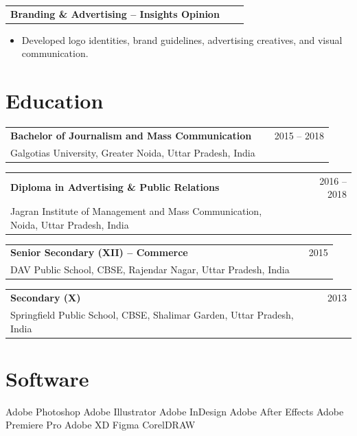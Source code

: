 \documentclass[a4paper,9pt]{article}
\makeatletter
\newenvironment{jobproject}[2]
    {
    \begin{tabularx}{\linewidth}{@{}l X r@{}}
    \textbf{#1} & \hfill & {\color{textgray} #2} \\[3.75pt]
    \end{tabularx}
    \begin{minipage}[t]{\linewidth}
    \begin{itemize}[nosep,after=\strut, leftmargin=1em, itemsep=3pt]
    }
    {
    \end{itemize}
    \end{minipage}
    }
\newenvironment{education}[3]
{
\begin{tabularx}{\linewidth}{@{}l X r@{}}
\textbf{#1} & \hfill & {\color{textgray} #3} \\
{\small\color{textgray} #2} & & \\[6pt]
\end{tabularx}
}
{}
\makeatother
\begin{document}
\begin{jobproject}{Branding \& Advertising – Insights Opinion}{}
\item  Developed logo identities, brand guidelines, advertising creatives, and visual communication.
\end{jobproject}

\section{Education}

\begin{education}
{Bachelor of Journalism and Mass Communication}
{Galgotias University, Greater Noida, Uttar Pradesh, India}
{2015 -- 2018}
\end{education}

\begin{education}
{Diploma in Advertising \& Public Relations}
{Jagran Institute of Management and Mass Communication, Noida, Uttar Pradesh, India}
{2016 -- 2018}
\end{education}

\begin{education}
{Senior Secondary (XII) – Commerce}
{DAV Public School, CBSE, Rajendar Nagar, Uttar Pradesh, India}
{2015}
\end{education}

\begin{education}
{Secondary (X)}
{Springfield Public School, CBSE, Shalimar Garden, Uttar Pradesh, India}
{2013}
\end{education}

\section{Software}

Adobe Photoshop \textbar{} Adobe Illustrator \textbar{} Adobe InDesign \textbar{} Adobe After Effects \textbar{} Adobe Premiere Pro \textbar{} Adobe XD \textbar{} Figma \textbar{} CorelDRAW

\end{document}
